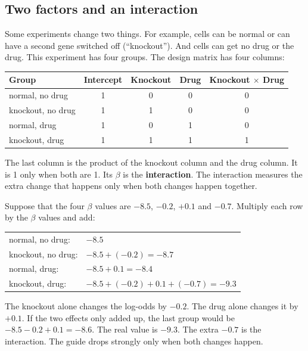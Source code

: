 \subsection{Two factors and an interaction}

Some experiments change two things. For example, cells can be normal or can
have a second gene switched off (``knockout''). And cells can get no drug or
the drug. This experiment has four groups. The design matrix has four
columns:

\begin{center}
\begin{tabular}{l|cccc}
\toprule
Group & Intercept & Knockout & Drug & Knockout $\times$ Drug\\
\midrule
normal, no drug   & 1 & 0 & 0 & 0\\
knockout, no drug & 1 & 1 & 0 & 0\\
normal, drug      & 1 & 0 & 1 & 0\\
knockout, drug    & 1 & 1 & 1 & 1\\
\bottomrule
\end{tabular}
\end{center}

The last column is the product of the knockout column and the drug column.
It is 1 only when both are 1. Its $\beta$ is the \textbf{interaction}. The
interaction measures the extra change that happens only when both changes
happen together.

\begin{worked}
Suppose that the four $\beta$ values are $-8.5$, $-0.2$, $+0.1$ and
$-0.7$. Multiply each row by the $\beta$ values and add:

\begin{tabular}{@{}ll@{}}
normal, no drug: & $-8.5$\\
knockout, no drug: & $-8.5 + (-0.2) = -8.7$\\
normal, drug: & $-8.5 + 0.1 = -8.4$\\
knockout, drug: & $-8.5 + (-0.2) + 0.1 + (-0.7) = -9.3$\\
\end{tabular}

\smallskip
The knockout alone changes the log-odds by $-0.2$. The drug alone changes it
by $+0.1$. If the two effects only added up, the last group would be
$-8.5 - 0.2 + 0.1 = -8.6$. The real value is $-9.3$. The extra $-0.7$ is the
interaction. The guide drops strongly only when both changes happen.
\end{worked}

